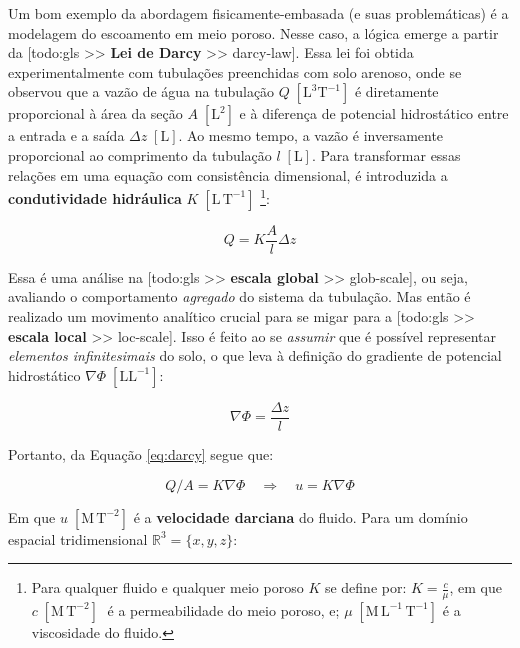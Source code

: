 \documentclass[./main.tex]{subfiles}
\begin{document}
\par Um bom exemplo da abordagem fisicamente-embasada (e suas problemáticas) é a modelagem do escoamento em meio poroso. Nesse caso, a lógica emerge a partir da [todo:gls >> \textbf{Lei de Darcy} >> darcy-law]. Essa lei foi obtida experimentalmente com tubulações preenchidas com solo arenoso, onde se observou que a vazão de água na tubulação $Q \; [\text{L}^{3}\text{T}^{-1}]$ é diretamente proporcional à área da seção $A \; [\text{L}^{2}]$ e à diferença de potencial hidrostático entre a entrada e a saída $\Delta z \; [\text{L}]$. Ao mesmo tempo, a vazão é inversamente proporcional ao comprimento da tubulação $l \; [\text{L}]$. Para transformar essas relações em uma equação com consistência dimensional, é introduzida a \textbf{condutividade hidráulica} $K \; [\text{L}\,\text{T}^{-1}]$ \footnote{Para qualquer fluido e qualquer meio poroso $K$ se define por: $K = \frac{c}{\mu}$, em que $c \; [\text{M}\,\text{T}^{-2}]\;$ é a permeabilidade do meio poroso, e; $\mu \; [\text{M}\,\text{L}^{-1}\,\text{T}^{-1}]$ é a viscosidade do fluido.}:
\begin{linenomath*}
\begin{equation}
\label{eq:darcy}
Q  = K \frac{A}{l}\Delta z 
\end{equation}
\end{linenomath*}
\noindent Essa é uma análise na [todo:gls >> \textbf{escala global} >> glob-scale], ou seja, avaliando o comportamento \textit{agregado} do sistema da tubulação. Mas então é realizado um movimento analítico crucial para se migar para a [todo:gls >> \textbf{escala local} >> loc-scale]. Isso é feito ao se \textit{assumir} que é possível representar \textit{elementos infinitesimais} do solo, o que leva à definição do gradiente de potencial hidrostático $\nabla \Phi \; [\text{L}\text{L}^{-1}]$:
\begin{linenomath*}
\begin{equation}
\label{eq:darcy-2}
\nabla \Phi = \frac{\Delta z}{l} 
\end{equation}
\end{linenomath*}
\noindent Portanto, da Equação \eqref{eq:darcy} segue que:
\begin{linenomath*}
\begin{equation}
\label{eq:darcy-3}
Q/A = K \nabla \Phi \quad \Rightarrow \quad u = K \nabla \Phi
\end{equation}
\end{linenomath*}
\noindent Em que $u \; [\text{M}\,\text{T}^{-2}]$ é a \textbf{velocidade darciana} do fluido. Para um domínio espacial tridimensional $\mathbb{R}^3=\{x, y, z \}$:
\end{document}

